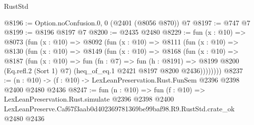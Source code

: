 \begin{lexlean}{RustStd}
\begin{coremodule}
@8196 := Option.noConfusion.{0, 0} (@2401 (@8056 @870)) @7
@8197 := @747 @7
@8199 := @8196 @8197 @7
@8200 := @2435 @2480
@8229 := fun (x : @10) =>
  @8073
    (fun (x : @10) =>
    @8092
      (fun (x : @10) =>
      @8111
        (fun (x : @10) =>
        @8130
          (fun (x : @10) =>
          @8149
            (fun (x : @10) =>
            @8168
              (fun (x : @10) =>
              @8187
                (fun (x : @10) =>
                fun (fn : @7) =>
                fun (h : @8191) =>
                @8199 @8200 (Eq.refl.{2} (Sort 1) @7) (heq_of_eq.{1} @2421 @8197 @8200 @2436))))))))
@8237 := (n : @10) -> (f : @10) -> LexLeanPreservation.Rust.FunSem @2396 @2398 @2400 @2480 @2436
@8247 := fun (n : @10) =>
  fun (f : @10) =>
  LexLeanPreservation.Rust.simulate
    @2396
    @2398
    @2400
    LexLeanPreserve.Caf67f3aab0d402369781369be99baf98.R9.RustStd.crate_ok
    @2480
    @2436
\end{coremodule}
\end{lexlean}
